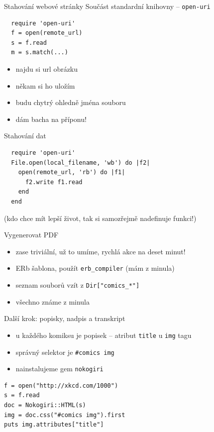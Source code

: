 \documentclass{beamer}
\begin{document}
\begin{frame}[fragile]{Stahování webové stránky}
  Součást standardní knihovny -- \texttt{open-uri}
  \scriptsize
\begin{verbatim}
  require 'open-uri'
  f = open(remote_url)
  s = f.read
  m = s.match(...)
\end{verbatim}
\end{frame}

\begin{frame}{}
  \begin{itemize}
    \item najdu si url obrázku
    \item někam si ho uložím
    \item budu chytrý ohledně jména souboru
    \item dám bacha na příponu!
  \end{itemize}
\end{frame}

\begin{frame}[fragile]{Stahování dat}
  \scriptsize
\begin{verbatim}
  require 'open-uri'
  File.open(local_filename, 'wb') do |f2|
    open(remote_url, 'rb') do |f1|
      f2.write f1.read
    end
  end
\end{verbatim}
(kdo chce mít lepší život, tak si samozřejmě nadefinuje funkci!)
\end{frame}

\begin{frame}{Vygenerovat PDF}
  \begin{itemize}
    \item zase triviální, už to umíme, rychlá akce na deset minut!
    \item ERb šablona, použít \texttt{erb\_compiler} (mám z minula)
    \item seznam souborů vzít z \texttt{Dir["comics\_*"]}
    \item všechno známe z minula
  \end{itemize}
\end{frame}

\begin{frame}[fragile]{Další krok: popisky, nadpis a transkript}
  \begin{itemize}
    \item u každého komiksu je popisek -- atribut \texttt{title} u \texttt{img} tagu
    \item správný selektor je \texttt{\#comics img}
    \item nainstalujeme gem \texttt{nokogiri}
  \end{itemize}
  {\scriptsize
  \begin{verbatim}
f = open("http://xkcd.com/1000")
s = f.read
doc = Nokogiri::HTML(s)
img = doc.css("#comics img").first
puts img.attributes["title"]
  \end{verbatim}
  }
\end{frame}
\end{document}
